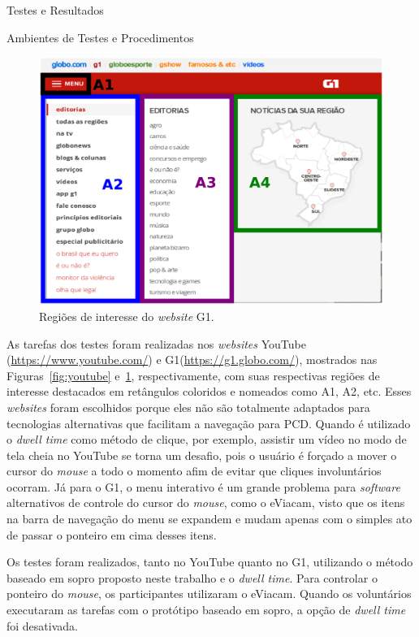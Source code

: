 \begin{chapter}{Testes e Resultados}
\begin{section}{Ambientes de Testes e Procedimentos}
\begin{figure}[!h]
	\centering
	\includegraphics[width=1.00\linewidth]{fig/g1}
	\caption{Regiões de interesse do \textit{website} G1.}
	\label{fig:g1}
\end{figure}

As tarefas dos testes foram realizadas nos \textit{websites} YouTube
(\url{https://www.youtube.com/}) e G1(\url{https://g1.globo.com/}), mostrados
nas Figuras~\ref{fig:youtube} e~\ref{fig:g1}, respectivamente, com suas
respectivas regiões de interesse destacados em retângulos coloridos e nomeados
como A1, A2, etc. Esses \textit{websites} foram escolhidos porque eles não são
totalmente adaptados para tecnologias alternativas que facilitam a navegação
para PCD. Quando é utilizado o \textit{dwell time} como método de clique, por
exemplo, assistir um vídeo no modo de tela cheia no YouTube se torna um desafio,
pois o usuário é forçado a mover o cursor do \textit{mouse} a todo o
momento afim de evitar que cliques involuntários ocorram. Já para o G1, o menu
interativo é um grande problema para \textit{software} alternativos de controle
do cursor do \textit{mouse}, como o eViacam, visto que os itens na barra de
navegação do menu se expandem e mudam apenas com o simples ato de passar o
ponteiro em cima desses itens.

Os testes foram realizados, tanto no YouTube quanto no G1, utilizando o método
baseado em sopro proposto neste trabalho e o \textit{dwell time}. Para controlar
o ponteiro do \textit{mouse}, os participantes utilizaram o eViacam. Quando os
voluntários executaram as tarefas com o protótipo baseado em sopro, a opção de 
\textit{dwell time} foi desativada. 


\end{section}
\end{chapter}
